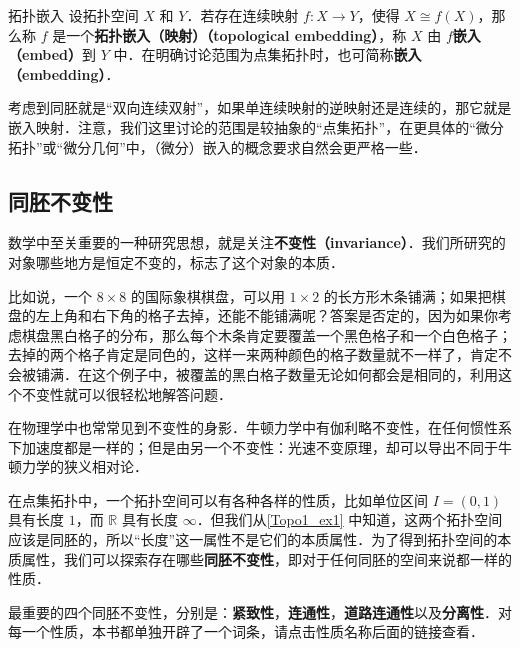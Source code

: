 \begin{definition}{拓扑嵌入}
设拓扑空间 $X$ 和 $Y$．若存在连续映射 $f:X\rightarrow Y$，使得 $X\cong f(X)$，那么称 $f$ 是一个\textbf{拓扑嵌入（映射）（topological embedding）}，称 $X$ 由 $f$\textbf{嵌入（embed）}到 $Y$ 中．在明确讨论范围为点集拓扑时，也可简称\textbf{嵌入（embedding）}．
\end{definition}

考虑到同胚就是“双向连续双射”，如果单连续映射的逆映射还是连续的，那它就是嵌入映射．注意，我们这里讨论的范围是较抽象的“点集拓扑”，在更具体的“微分拓扑”或“微分几何”中，（微分）嵌入的概念要求自然会更严格一些．




\subsection{同胚不变性}

数学中至关重要的一种研究思想，就是关注\textbf{不变性（invariance）}．我们所研究的对象哪些地方是恒定不变的，标志了这个对象的本质．

比如说，一个 $8\times8$ 的国际象棋棋盘，可以用 $1\times2$ 的长方形木条铺满；如果把棋盘的左上角和右下角的格子去掉，还能不能铺满呢？答案是否定的，因为如果你考虑棋盘黑白格子的分布，那么每个木条肯定要覆盖一个黑色格子和一个白色格子；去掉的两个格子肯定是同色的，这样一来两种颜色的格子数量就不一样了，肯定不会被铺满．在这个例子中，被覆盖的黑白格子数量无论如何都会是相同的，利用这个不变性就可以很轻松地解答问题．

在物理学中也常常见到不变性的身影．牛顿力学中有伽利略不变性，在任何惯性系下加速度都是一样的；但是由另一个不变性：光速不变原理，却可以导出不同于牛顿力学的狭义相对论．

在点集拓扑中，一个拓扑空间可以有各种各样的性质，比如单位区间 $I=(0,1)$ 具有长度 $1$，而 $\mathbb{R}$ 具有长度 $\infty$．但我们从\autoref{Topo1_ex1} 中知道，这两个拓扑空间应该是同胚的，所以“长度”这一属性不是它们的本质属性．为了得到拓扑空间的本质属性，我们可以探索存在哪些\textbf{同胚不变性}，即对于任何同胚的空间来说都一样的性质．

最重要的四个同胚不变性，分别是：\textbf{紧致性}，\textbf{连通性}，\textbf{道路连通性}以及\textbf{分离性}．对每一个性质，本书都单独开辟了一个词条，请点击性质名称后面的链接查看．
